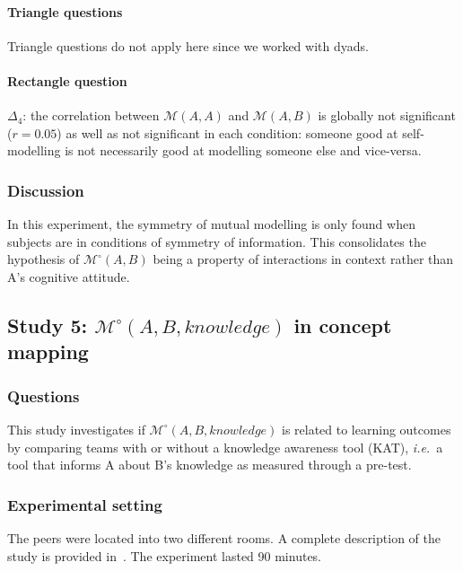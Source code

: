 \documentclass[twocolumn]{article}
\newcommand{\ie}{{\textit{i.e.\ }}}
\newcommand{\gmodel}[2]{{$\mathcal{M}(#1, #2)$}}
\newcommand{\Model}[3]{{$\mathcal{M}^{\circ}(#1, #2, #3)$}}
\newcommand{\gModel}[2]{{$\mathcal{M}^{\circ}(#1, #2)$}}
\begin{document}
\paragraph{Triangle questions} Triangle questions do not apply here since we
worked with dyads.

\paragraph{Rectangle question}$\Delta_4$: the correlation between \gmodel{A}{A}
and \gmodel{A}{B} is globally not significant ($r=0.05$) as well as not
significant in each condition: someone good at self-modelling is not necessarily
good at modelling someone else and vice-versa.

\subsubsection*{Discussion}

In this experiment, the symmetry of mutual modelling is only found when subjects
are in conditions of symmetry of information. This consolidates the hypothesis
of \gModel{A}{B} being a property of interactions in context rather than A's
cognitive attitude.



\subsection{Study 5: \Model{A}{B}{knowledge} in concept mapping}

\subsubsection*{Questions}

This study investigates if \Model{A}{B}{knowledge} is related to learning
outcomes by comparing teams with or without a knowledge awareness tool (KAT),
\ie a tool that informs A about B's knowledge as measured through a pre-test.

\subsubsection*{Experimental setting}

The peers were located into two different rooms. A complete description of the
study is provided in~\citep{sangin2008learners}. The experiment lasted 90 minutes.
\end{document}
